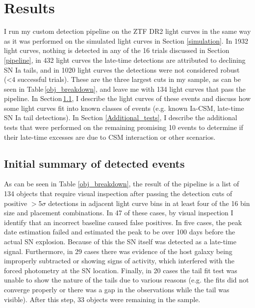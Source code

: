\documentclass[a4paper,oneside,12pt, class=Latex/Classes/PhDthesisPSnPDF, crop=false]{standalone}
\begin{document}
\section{Results}
\label{DR2_results}
I run my custom detection pipeline on the ZTF DR2 light curves in the same way as it was performed on the simulated light curves in Section \ref{simulation}. In 1932 light curves, nothing is detected in any of the 16 trials discussed in Section \ref{pipeline}, in 432 light curves the late-time detections are attributed to declining SN Ia tails, and in 1020 light curves the detections were not considered robust (<4 successful trials). These are the three largest cuts in my sample, as can be seen in Table\,\ref{obj_breakdown}, and leave me with 134 light curves that pass the pipeline. In Section\,\ref{results_summary}, I describe the light curves of these events and discuss how some light curves fit into known classes of events (e.g. known Ia-CSM, late-time SN Ia tail detections). In Section \ref{Additional_tests}, I describe the additional tests that were performed on the remaining promising 10 events to determine if their late-time excesses are due to CSM interaction or other scenarios. 


\subsection{Initial summary of detected events}
\label{results_summary}
As can be seen in Table \ref{obj_breakdown}, the result of the pipeline is a list of 134 objects that require visual inspection after passing the detection cuts of positive $>$5$\sigma$ detections in adjacent light curve bins in at least four of the 16 bin size and placement combinations. In 47 of these cases, by visual inspection I identify that an incorrect baseline caused false positives. In five cases, the peak date estimation failed and estimated the peak to be over 100 days before the actual SN explosion. Because of this the SN itself was detected as a late-time signal. Furthermore, in 29 cases there was evidence of the host galaxy being improperly subtracted or showing signs of activity, which interfered with the forced photometry at the SN location. Finally, in 20 cases the tail fit test was unable to show the nature of the tails due to various reasons (e.g. the fits did not converge properly or there was a gap in the observations while the tail was visible). After this step, 33 objects were remaining in the sample.
\end{document}
